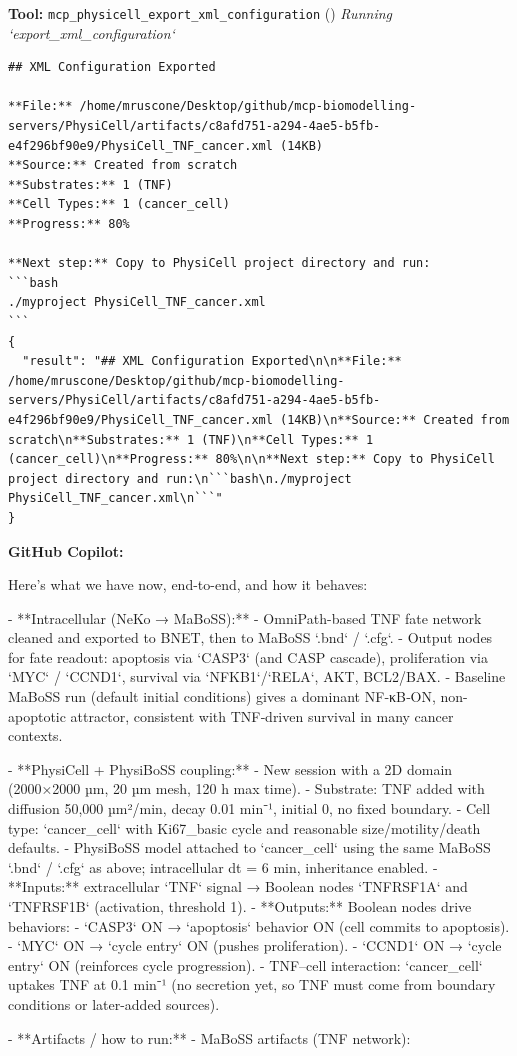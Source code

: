 \documentclass[11pt,a4paper]{article}
\begin{document}
\begin{toolokbox}
\textbf{Tool:} \texttt{mcp\_physicell\_export\_xml\_configuration} (\checkmark)
\textit{Running `export\_xml\_configuration`}
\begin{lstlisting}
## XML Configuration Exported

**File:** /home/mruscone/Desktop/github/mcp-biomodelling-servers/PhysiCell/artifacts/c8afd751-a294-4ae5-b5fb-e4f296bf90e9/PhysiCell_TNF_cancer.xml (14KB)
**Source:** Created from scratch
**Substrates:** 1 (TNF)
**Cell Types:** 1 (cancer_cell)
**Progress:** 80%

**Next step:** Copy to PhysiCell project directory and run:
```bash
./myproject PhysiCell_TNF_cancer.xml
```
{
  "result": "## XML Configuration Exported\n\n**File:** /home/mruscone/Desktop/github/mcp-biomodelling-servers/PhysiCell/artifacts/c8afd751-a294-4ae5-b5fb-e4f296bf90e9/PhysiCell_TNF_cancer.xml (14KB)\n**Source:** Created from scratch\n**Substrates:** 1 (TNF)\n**Cell Types:** 1 (cancer_cell)\n**Progress:** 80%\n\n**Next step:** Copy to PhysiCell project directory and run:\n```bash\n./myproject PhysiCell_TNF_cancer.xml\n```"
}
\end{lstlisting}
\end{toolokbox}
\begin{copilotbox}
\textbf{GitHub Copilot:}

Here’s what we have now, end-to-end, and how it behaves:

- **Intracellular (NeKo → MaBoSS):**
  - OmniPath-based TNF fate network cleaned and exported to BNET, then to MaBoSS `.bnd` / `.cfg`.
  - Output nodes for fate readout: apoptosis via `CASP3` (and CASP cascade), proliferation via `MYC` / `CCND1`, survival via `NFKB1`/`RELA`, AKT, BCL2/BAX.
  - Baseline MaBoSS run (default initial conditions) gives a dominant NF‑κB‑ON, non-apoptotic attractor, consistent with TNF‑driven survival in many cancer contexts.

- **PhysiCell + PhysiBoSS coupling:**
  - New session with a 2D domain (2000×2000 µm, 20 µm mesh, 120 h max time).
  - Substrate: TNF added with diffusion 50,000 µm²/min, decay 0.01 min⁻¹, initial 0, no fixed boundary.
  - Cell type: `cancer\_cell` with Ki67\_basic cycle and reasonable size/motility/death defaults.
  - PhysiBoSS model attached to `cancer\_cell` using the same MaBoSS `.bnd` / `.cfg` as above; intracellular dt = 6 min, inheritance enabled.
  - **Inputs:** extracellular `TNF` signal → Boolean nodes `TNFRSF1A` and `TNFRSF1B` (activation, threshold 1).
  - **Outputs:** Boolean nodes drive behaviors:
    - `CASP3` ON → `apoptosis` behavior ON (cell commits to apoptosis).
    - `MYC` ON → `cycle entry` ON (pushes proliferation).
    - `CCND1` ON → `cycle entry` ON (reinforces cycle progression).
  - TNF–cell interaction: `cancer\_cell` uptakes TNF at 0.1 min⁻¹ (no secretion yet, so TNF must come from boundary conditions or later-added sources).

- **Artifacts / how to run:**
  - MaBoSS artifacts (TNF network):

\end{copilotbox}
\end{document}
